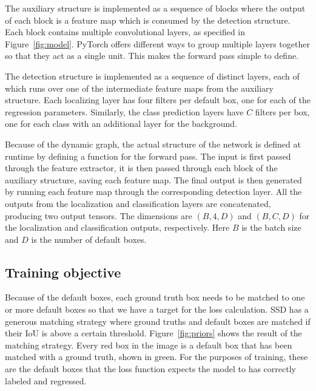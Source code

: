 The auxiliary structure is implemented as a sequence of blocks where the output of each block is a feature map which is consumed by the detection structure.
Each block contains multiple convolutional layers, as specified in Figure~\ref{fig:model}.
PyTorch offers different ways to group multiple layers together so that they act as a single unit.
This makes the forward pass simple to define.

The detection structure is implemented as a sequence of distinct layers, each of which runs over one of the intermediate feature maps from the auxiliary structure.
Each localizing layer has four filters per default box, one for each of the regression parameters.
Similarly, the class prediction layers have \(C\) filters per box, one for each class with an additional layer for the background.

Because of the dynamic graph, the actual structure of the network is defined at runtime by defining a function for the forward pass.
The input is first passed through the feature extractor, it is then passed through each block of the auxiliary structure, saving each feature map.
The final output is then generated by running each feature map through the corresponding detection layer.
All the outputs from the localization and classification layers are concatenated, producing two output tensors.
The dimensions are \(\left(B,4,D\right) \) and \(\left(B,C,D\right) \) for the localization and classification outputs, respectively.
Here \(B\) is the batch size and \(D\) is the number of default boxes.


\subsection{Training objective}
Because of the default boxes, each ground truth box needs to be matched to one or more default boxes so that we have a target for the loss calculation.
SSD has a generous matching strategy where ground truths and default boxes are matched if their IoU is above a certain threshold. Figure~\ref{fig:priors} shows the result of the matching strategy. Every red box in the image is a default box that has been matched with a ground truth, shown in green. For the purposes of training, these are the default boxes that the loss function expects the model to has correctly labeled and regressed.


